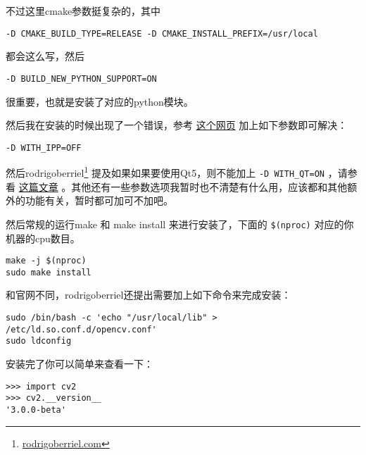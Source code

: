 \documentclass[11pt,oneside]{article}
\begin{document}
不过这里cmake参数挺复杂的，其中
\begin{Verbatim}
-D CMAKE_BUILD_TYPE=RELEASE -D CMAKE_INSTALL_PREFIX=/usr/local
\end{Verbatim}
都会这么写，然后
\begin{Verbatim}
-D BUILD_NEW_PYTHON_SUPPORT=ON
\end{Verbatim}
很重要，也就是安装了对应的python模块。

然后我在安装的时候出现了一个错误，参考 \href{http://answers.opencv.org/question/37115/opencv-249-make-error/}{这个网页} 加上如下参数即可解决：
\begin{Verbatim}
-D WITH_IPP=OFF
\end{Verbatim}

然后rodrigoberriel\footnote{\href{http://rodrigoberriel.com/2014/10/installing-opencv-3-0-0-on-ubuntu-14-04/}{rodrigoberriel.com}} 提及如果如果要使用Qt5，则不能加上 \verb~-D WITH_QT=ON~ ，请参看 \href{http://rodrigoberriel.com/2014/11/using-opencv-3-qt-creator-3-2-qt-5-3/}{这篇文章} 。其他还有一些参数选项我暂时也不清楚有什么用，应该都和其他额外的功能有关，暂时都可加可不加吧。

然后常规的运行make 和 make install 来进行安装了，下面的 \verb~$(nproc)~ 对应的你机器的cpu数目。
\begin{Verbatim}
make -j $(nproc)
sudo make install
\end{Verbatim}

和官网不同，rodrigoberriel还提出需要加上如下命令来完成安装：
\begin{Verbatim}
sudo /bin/bash -c 'echo "/usr/local/lib" > /etc/ld.so.conf.d/opencv.conf'
sudo ldconfig
\end{Verbatim}


安装完了你可以简单来查看一下：
\begin{Verbatim}
>>> import cv2
>>> cv2.__version__
'3.0.0-beta'
\end{Verbatim}
\end{document}
